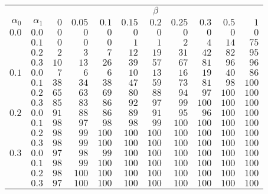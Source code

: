 \begin{tabular}{rr|rrrrrrrrr}
\hline\hline
 && \multicolumn{9}{c}{$\beta$}\\
 $\alpha_0$ & $\alpha_1$ & $0$ & $0.05$ & $0.1$ & $0.15$ & $0.2$ & $0.25$ & $0.3$ & $0.5$ & $1$ \\ 
 \hline
$0.0$ & $0.0$ & $0$ & $0$ & $0$ & $0$ & $0$ & $0$ & $0$ & $0$ & $0$\\ 
 & $0.1$ & $0$ & $0$ & $0$ & $1$ & $1$ & $2$ & $4$ & $14$ & $75$\\ 
 & $0.2$ & $2$ & $3$ & $7$ & $12$ & $19$ & $31$ & $42$ & $82$ & $95$\\ 
 & $0.3$ & $10$ & $13$ & $26$ & $39$ & $57$ & $67$ & $81$ & $96$ & $96$\\ 
\hline 
 $0.1$ & $0.0$ & $7$ & $6$ & $6$ & $10$ & $13$ & $16$ & $19$ & $40$ & $86$\\ 
 & $0.1$ & $38$ & $34$ & $38$ & $47$ & $59$ & $73$ & $81$ & $98$ & $100$\\ 
 & $0.2$ & $65$ & $63$ & $69$ & $80$ & $88$ & $94$ & $97$ & $100$ & $100$\\ 
 & $0.3$ & $85$ & $83$ & $86$ & $92$ & $97$ & $99$ & $100$ & $100$ & $100$\\ 
\hline 
 $0.2$ & $0.0$ & $91$ & $88$ & $86$ & $89$ & $91$ & $95$ & $96$ & $100$ & $100$\\ 
 & $0.1$ & $98$ & $97$ & $98$ & $98$ & $99$ & $100$ & $100$ & $100$ & $100$\\ 
 & $0.2$ & $98$ & $99$ & $100$ & $100$ & $100$ & $100$ & $100$ & $100$ & $100$\\ 
 & $0.3$ & $98$ & $99$ & $100$ & $100$ & $100$ & $100$ & $100$ & $100$ & $100$\\ 
\hline 
 $0.3$ & $0.0$ & $97$ & $98$ & $99$ & $100$ & $100$ & $100$ & $100$ & $100$ & $100$\\ 
 & $0.1$ & $98$ & $99$ & $100$ & $100$ & $100$ & $100$ & $100$ & $100$ & $100$\\ 
 & $0.2$ & $98$ & $100$ & $100$ & $100$ & $100$ & $100$ & $100$ & $100$ & $100$\\ 
 & $0.3$ & $97$ & $100$ & $100$ & $100$ & $100$ & $100$ & $100$ & $100$ & $100$\\ 
 \hline 
 \end{tabular}